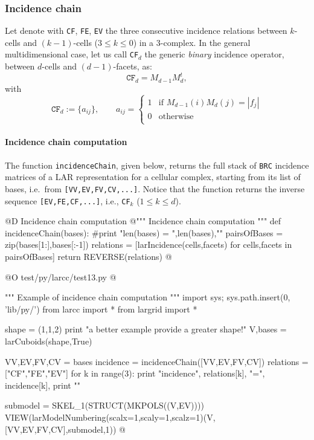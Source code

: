 \documentclass[11pt,oneside]{article}	%
\begin{document}
\subsubsection{Incidence chain}

Let denote with \texttt{CF}, \texttt{FE}, \texttt{EV} the three consecutive incidence relations between $k$-cells and $(k-1)$-cells ($3\leq k\leq 0$) in a 3-complex. In the general multidimensional case, let us call \texttt{CF}$_d$  the generic \emph{binary} incidence operator, between $d$-cells and $(d-1)$-facets, as:
\[
\texttt{CF}_d = M_{d-1} M_d^t, 
\]
with
\[
\texttt{CF}_d := \{a_{ij}\}, \qquad a_{ij} = 
\left\{
\begin{array}{cl}
1 & \mbox{if\ } M_{d-1}(i) M_d(j) = |f_j|  \\
0 & \mbox{otherwise}  \\  
\end{array}
\right.
\]

\paragraph{Incidence chain computation}
The function \texttt{incidenceChain}, given below, returns the full stack of \texttt{BRC} incidence matrices of a LAR representation for a cellular complex, starting from its list of bases, i.e.~from \texttt{[VV,EV,FV,CV,...]}. Notice that the function returns the inverse sequence 
\texttt{[EV,FE,CF,...]}, i.e., \texttt{CF}$_k$ ($1\leq k\leq d$).

@D Incidence chain computation
@{""" Incidence chain computation """
def incidenceChain(bases):
	#print "\n len(bases) = ",len(bases),"\n"
	pairsOfBases = zip(bases[1:],bases[:-1])
	relations = [larIncidence(cells,facets) 
					for cells,facets in pairsOfBases]
	return REVERSE(relations)
@}

@O test/py/larcc/test13.py
@{""" Example of incidence chain computation """
import sys; sys.path.insert(0, 'lib/py/')
from larcc import *
from largrid import *

shape = (1,1,2) 
print "\n\nFor a better example provide a greater shape!"
V,bases = larCuboids(shape,True)

VV,EV,FV,CV = bases
incidence = incidenceChain([VV,EV,FV,CV])
relations = ["CF","FE","EV"]
for k in range(3):
	print "\n\n incidence", relations[k], "=\n", incidence[k],
print "\n\n"

submodel = SKEL_1(STRUCT(MKPOLS((V,EV))))
VIEW(larModelNumbering(scalx=1,scaly=1,scalz=1)(V,[VV,EV,FV,CV],submodel,1))
@}
\end{document}
